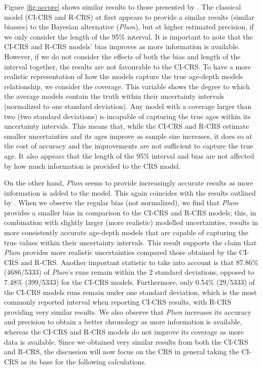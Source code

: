 \documentclass [10pt] {article}
\begin{document}
Figure \ref{fig:accpre} shows similar results to those presented by \citet{Blaauw2018}. 
The classical model (CI-CRS and R-CRS) at first appears to provide a similar results (similar biasses) to the Bayesian alternative (\textit{Plum}), but at higher estimated precision, if we only consider the length of the 95\% interval. 
It is important to note that the CI-CRS and R-CRS models' bias improves as more information is available.
However, if we do not consider the effects of both the bias and length of the interval together, the results are not favourable to the CI-CRS. 
To have a more realistic representation of how the models capture the true age-depth models relationship, we consider the coverage. 
This variable shows the degree to which the average models contain the truth within their uncertainty intervals (normalized to one standard deviation). 
Any model with a coverage larger than two (two standard deviations) is incapable of capturing the true ages within its uncertainty intervals.  
This means that, while the CI-CRS and R-CRS estimate smaller uncertainties and its ages improve as sample size increases, it does so at the cost of accuracy and the improvements are not sufficient to capture the true age.
It also appears that the length of the 95\% interval and bias are not affected by how much information is provided to the CRS model. 

On the other hand, \textit{Plum} seems to provide increasingly accurate results as more information is added to the model.
This again coincides with the results outlined by \citet{Blaauw2018}. 
When we observe the regular bias (not normalized), we find that \textit{Plum} provides a smaller bias in comparison to the CI-CRS and R-CRS models; this, in combination with slightly larger (more realistic) modelled uncertainties, results in more consistently accurate age-depth models that are capable of capturing the true values within their uncertainty intervals. 
This result supports the claim that \textit{Plum} provides more realistic uncertainties compared those obtained by the CI-CRS and R-CRS. 
Another important statistic to take into account is that 87.86\% (4686/5333) of \textit{Plum}'s runs remain within the 2 standard deviations, opposed to 7.48\% (399/5333) for the CI-CRS models. Furthermore, only 0.54\% (29/5333) of the CI-CRS models runs remain under one standard deviation, which is the most commonly reported interval when reporting CI-CRS results, with R-CRS providing very similar results.
We also observe that \textit{Plum} increases its accuracy and precision to obtain a better chronology as more information is available, whereas the CI-CRS and R-CRS models do not improve its coverage as more data is available. 
Since we obtained very similar results from both the CI-CRS and R-CRS, the discussion will now focus on the CRS in general taking the CI-CRS as its base for the following calculations.
\end{document}
